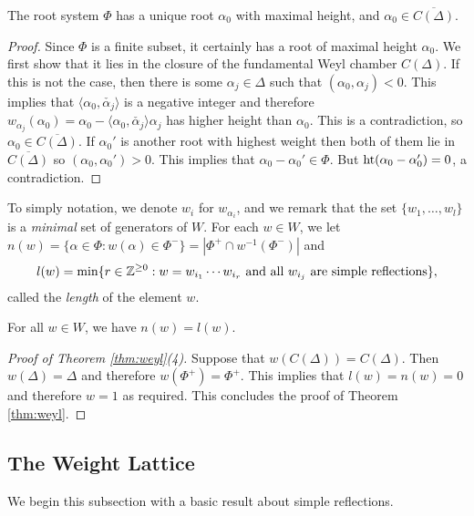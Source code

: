 \begin{lemma}
    The root system $\Phi$ has a unique root $\alpha_0$ with maximal height, and $\alpha_0\in\overline{C(\Delta)}$.
\end{lemma}

\begin{proof}
    Since $\Phi$ is a finite subset, it certainly has a root of maximal height $\alpha_0$. We first show that it lies in the closure of the fundamental Weyl chamber $C(\Delta)$. If this is not the case, then there is some $\alpha_j\in\Delta$ such that $(\alpha_0,\alpha_j)<0$. This implies that $\langle\alpha_0,\check{\alpha_j}\rangle$ is a negative integer and therefore $w_{\alpha_j}(\alpha_0)=\alpha_0-\langle\alpha_0,\check{\alpha_j}\rangle\alpha_j$ has higher height than $\alpha_0$. This is a contradiction, so $\alpha_0\in\overline{C(\Delta)}$.
    If $\alpha_0'$ is another root with highest weight then both of them lie in $\overline{C(\Delta)}$ so $(\alpha_0,\alpha_0')>0$. This implies that $\alpha_0-\alpha_0'\in\Phi$. But $\mathrm{ht}(\alpha_0-\alpha_0')=0$, a contradiction.
\end{proof}

To simply notation, we denote $w_i$ for $w_{\alpha_i}$, and we remark that the set $\{w_1,\ldots,w_l\}$ is a \textit{minimal} set of generators of $W$. For each $w\in W$, we let $n(w)=\{\alpha\in\Phi:w(\alpha)\in\Phi^-\}=|\Phi^+\cap w^{-1}(\Phi^-)|$
and
$$l(w)=\min\{r\in\mathbb{Z}^{\geq0}:w=w_{i_1}\cdots w_{i_r} \text{ and all } w_{i_j} \text{ are simple reflections}\},$$
called the \textit{length} of the element $w$.

\begin{proposition}
    For all $w\in W$, we have $n(w)=l(w)$.
\end{proposition}

\begin{proof}[Proof of Theorem \ref{thm:weyl}(4)]
    Suppose that $w(C(\Delta))=C(\Delta)$. Then $w(\Delta)=\Delta$ and therefore $w(\Phi^+)=\Phi^+$. This implies that $l(w)=n(w)=0$ and therefore $w=1$ as required. This concludes the proof of Theorem \ref{thm:weyl}.
\end{proof}





\subsection{The Weight Lattice}

We begin this subsection with a basic result about simple reflections.

